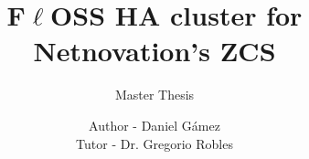 \documentclass{beamer}
\begin{document}
\title{F$\ell$OSS HA cluster for Netnovation's ZCS}
\subtitle{Master Thesis}

\author[Daniel G\'amez]{
Author - Daniel G\'amez \\
Tutor - Dr. Gregorio Robles}
\date{}



\normalsize

\section[Index]{}

\begin{frame}%
  \tableofcontents
\end{frame}

  
  
  
  
    
  
  
  
  
  
  
  
\end{document}
